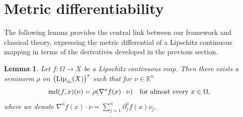 \documentclass[reqno]{amsart}
\newtheorem{lem}[thm]{Lemma}
\begin{document}
\section{Metric differentiability}\label{sec4}
The following lemma provides the central link between our framework and classical theory, expressing the metric differential of a Lipschitz continuous mapping in terms of the derivatives developed in the previous section. 
\begin{lem}\label{lemma:md=rho}
 Let $f:\Omega\to X$ be a Lipschitz continuous map.
 Then there exists a seminorm $\rho$ on $\left(\textnormal{Lip}_{z_0}(X)\right)^*$ such that  
 for $\nu\in\mathbb R^n$
 \begin{equation}\label{eq:md=rho}
 \textnormal{md}(f, x)(\nu) = \rho(\nabla^of(x)\cdot\nu )  \quad \textnormal{for almost every } x\in\Omega,
 \end{equation}
 where we denote $\nabla^of(x)\cdot\nu  = \sum_{j=1}^n\partial^o_jf(x)\nu_j$.
 \end{lem}
\end{document}
